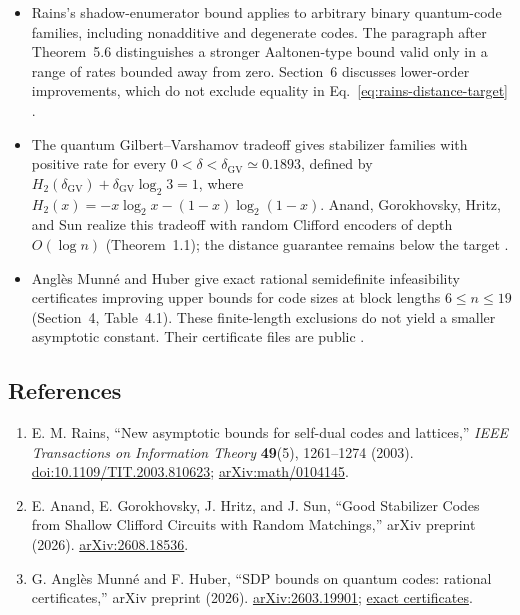 \begin{itemize}
  \item Rains's shadow-enumerator bound applies to arbitrary binary quantum-code families, including nonadditive and degenerate codes. The paragraph after Theorem~5.6 distinguishes a stronger Aaltonen-type bound valid only in a range of rates bounded away from zero. Section~6 discusses lower-order improvements, which do not exclude equality in Eq.~\eqref{eq:rains-distance-target} .

  \item The quantum Gilbert--Varshamov tradeoff gives stabilizer families with positive rate for every $0<\delta<\delta_{\mathrm{GV}}\simeq0.1893$, defined by $H_2(\delta_{\mathrm{GV}})+\delta_{\mathrm{GV}}\log_2 3=1$, where $H_2(x)=-x\log_2x-(1-x)\log_2(1-x)$. Anand, Gorokhovsky, Hritz, and Sun realize this tradeoff with random Clifford encoders of depth $O(\log n)$ (Theorem~1.1); the distance guarantee remains below the target .

  \item Angl\`es Munn\'e and Huber give exact rational semidefinite infeasibility certificates improving upper bounds for code sizes at block lengths $6\leq n\leq19$ (Section~4, Table~4.1). These finite-length exclusions do not yield a smaller asymptotic constant. Their certificate files are public .
\end{itemize}

\subsection*{References}

\begin{enumerate}[label={},leftmargin=4.8em,labelsep=0.5em]
  \footnotesize
  \item[\textup{[Rai03]}]\label{ref:rains-distance-bound}
  E. M. Rains, ``New asymptotic bounds for self-dual codes and lattices,'' \emph{IEEE Transactions on Information Theory} \textbf{49}(5), 1261--1274 (2003). \href{https://doi.org/10.1109/TIT.2003.810623}{doi:10.1109/TIT.2003.810623}; \href{https://arxiv.org/abs/math/0104145}{arXiv:math/0104145}.

  \item[\textup{[AGHS26]}]\label{ref:rains-distance-gv}
  E. Anand, E. Gorokhovsky, J. Hritz, and J. Sun, ``Good Stabilizer Codes from Shallow Clifford Circuits with Random Matchings,'' arXiv preprint (2026). \href{https://arxiv.org/abs/2608.18536}{arXiv:2608.18536}.

  \item[\textup{[AMH26]}]\label{ref:rains-distance-sdp}
  G. Angl\`es Munn\'e and F. Huber, ``SDP bounds on quantum codes: rational certificates,'' arXiv preprint (2026). \href{https://arxiv.org/abs/2603.19901}{arXiv:2603.19901}; \href{https://github.com/ganglesmunne/SDP_bounds_on_quantum_codes_rational_certificates}{exact certificates}.
\end{enumerate}


